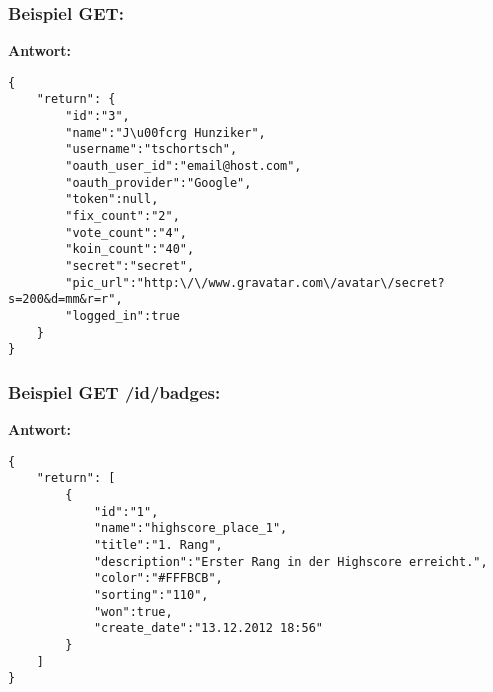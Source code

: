 \subsubsection{Beispiel GET:}


\textbf{Antwort:}

\lstset{language=JavaScript}
\begin{lstlisting}[style=examples]
{
	"return": {
		"id":"3",
		"name":"J\u00fcrg Hunziker",
		"username":"tschortsch",
		"oauth_user_id":"email@host.com",
		"oauth_provider":"Google",
		"token":null,
		"fix_count":"2",
		"vote_count":"4",
		"koin_count":"40",
		"secret":"secret",
		"pic_url":"http:\/\/www.gravatar.com\/avatar\/secret?s=200&d=mm&r=r",
		"logged_in":true
	}
}
\end{lstlisting}

\subsubsection{Beispiel GET /id/badges:}


\textbf{Antwort:}

\lstset{language=JavaScript}
\begin{lstlisting}[style=examples]
{
	"return": [
		{
			"id":"1",
			"name":"highscore_place_1",
			"title":"1. Rang",
			"description":"Erster Rang in der Highscore erreicht.",
			"color":"#FFFBCB",
			"sorting":"110",
			"won":true,
			"create_date":"13.12.2012 18:56"
		}
	]
}
\end{lstlisting}

